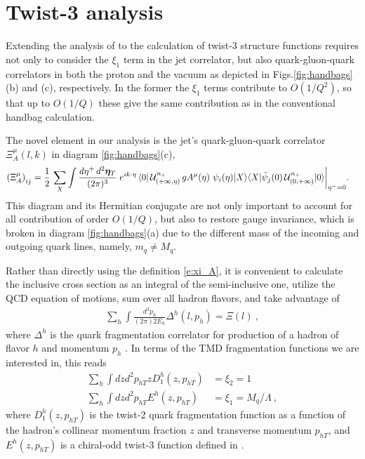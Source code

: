 \documentclass[preprintnumbers,floatfix,nofootinbib]{revtex4}
\newcommand{\de}{d}                    %
\newcommand{\ii}{i}                    %
\newcommand{\mj}{M_q}
\newcommand{\mq}{m_q}
\begin{document}
\section{Twist-3 analysis}

Extending the analysis of \cite{Accardi:2008ne} to the calculation of twist-3
structure functions requires not only to consider the $\xi_1$ term in the jet
correlator, but also quark-gluon-quark correlators in both the proton and the
vacuum as depicted in Figs.\ref{fig:handbags}(b) and (c), respectively. 
In the former the $\xi_1$ terms contribute to $O(1/Q^2)$, so that up to $O(1/Q)$
these give the same contribution as in the conventional handbag calculation.  

The novel element in our analysis is the jet's quark-gluon-quark correlator
$\Xi_A^{\mu}(l,k)$ in diagram \ref{fig:handbags}(c), 
\begin{equation} 
\begin{split} 
  \left(\Xi_A^{\mu} \right)_{ij} &=
   \frac{1}{2}\, \sum_X \int \frac{\de \eta^+\, \de^2 \bm{\eta}_T}{(2\pi)^{3}}\;
   e^{\ii k \cdot \eta}\,
   \langle 0|\,
   {\cal U}^{n_+}_{(+\infty,\eta)}\,
   g A^{\mu}(\eta)\,
   \,\psi_i(\eta)|X\rangle
   \langle X|
             \bar{\psi}_j(0)\,
   {\cal U}^{n_+}_{(0,+\infty)}
   |0\rangle \bigg|_{\eta^-=0} .
\label{e:xi_A}
\end{split} 
\end{equation}  
This diagram and its Hermitian conjugate are not only important to account for
all contribution of order $O(1/Q)$, but also to restore gauge invariance, which is broken in diagram \ref{fig:handbags}(a) due to the different mass
of the incoming and outgoing quark lines, namely, $\mq \neq \mj$. 

Rather than directly using the definition \eqref{e:xi_A}, it is convenient to
calculate the inclusive cross section as an integral of the semi-inclusive
one, utilize the QCD equation of motions, sum over all
hadron flavors, and take advantage of  
\begin{align}
  \label{eq:SIDIS_to_DIS}
  \sum_h \int \frac{d^3p_h}{(2\pi)2E_h} \Delta^h(l,p_h) = \Xi(l) \ , 
\end{align}
where $\Delta^h$ is the quark fragmentation correlator for production of a
hadron of flavor $h$ and momentum $p_h$ \cite{Bacchetta:2006tn}. In terms of
the TMD fragmentation functions we are interested in, this reads 
\begin{align}
  \label{eq:SIDIS_to_DIS_TMDlevel}
  \sum_h \int dz d^2p_{hT} z D_1^h(z,p_{hT}) & = \xi_2 = 1   \\
  \sum_h \int dz d^2p_{hT} E^h(z,p_{hT}) & = \xi_1 = \mj / \Lambda\ ,
\end{align}
where $D_1^h(z,p_{hT})$ is the twist-2 quark fragmentation function as a
function of the hadron's collinear momentum fraction $z$ and transverse
momentum $p_{hT}$, and $E^h(z,p_{hT})$ is a chiral-odd twist-3 function
defined in \cite{Bacchetta:2006tn}. 
\end{document}
